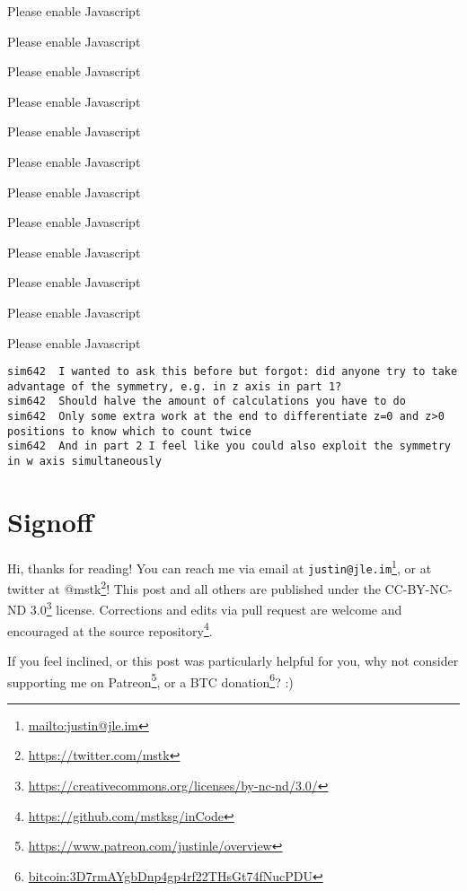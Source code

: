 \documentclass[]{article}
\renewcommand{\href}[2]{#2\footnote{\url{#1}}}
\begin{document}
\leavevmode\hypertarget{golDrawer}{}%
Please enable Javascript

\leavevmode\hypertarget{gol2D}{}%
Please enable Javascript

\leavevmode\hypertarget{gol3D}{}%
Please enable Javascript

\leavevmode\hypertarget{gol4D}{}%
Please enable Javascript

\leavevmode\hypertarget{golFlat}{}%
Please enable Javascript

\leavevmode\hypertarget{golSyms3DForward}{}%
Please enable Javascript

\leavevmode\hypertarget{golSyms3DReverse}{}%
Please enable Javascript

\leavevmode\hypertarget{golSyms4DForward}{}%
Please enable Javascript

\leavevmode\hypertarget{golSyms4DReverse}{}%
Please enable Javascript

\leavevmode\hypertarget{golTreeForward}{}%
Please enable Javascript

\leavevmode\hypertarget{golTreeReverse}{}%
Please enable Javascript

\leavevmode\hypertarget{golSyms5D}{}%
Please enable Javascript

\begin{verbatim}
sim642  I wanted to ask this before but forgot: did anyone try to take advantage of the symmetry, e.g. in z axis in part 1?
sim642  Should halve the amount of calculations you have to do
sim642  Only some extra work at the end to differentiate z=0 and z>0 positions to know which to count twice
sim642  And in part 2 I feel like you could also exploit the symmetry in w axis simultaneously
\end{verbatim}

\hypertarget{signoff}{%
\section{Signoff}\label{signoff}}

Hi, thanks for reading! You can reach me via email at
\href{mailto:justin@jle.im}{\nolinkurl{justin@jle.im}}, or at twitter at
\href{https://twitter.com/mstk}{@mstk}! This post and all others are published
under the \href{https://creativecommons.org/licenses/by-nc-nd/3.0/}{CC-BY-NC-ND
3.0} license. Corrections and edits via pull request are welcome and encouraged
at \href{https://github.com/mstksg/inCode}{the source repository}.

If you feel inclined, or this post was particularly helpful for you, why not
consider \href{https://www.patreon.com/justinle/overview}{supporting me on
Patreon}, or a \href{bitcoin:3D7rmAYgbDnp4gp4rf22THsGt74fNucPDU}{BTC donation}?
:)
\end{document}
